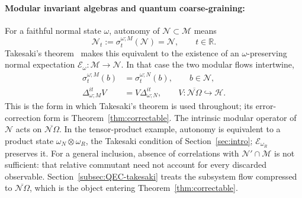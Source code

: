 \documentclass[a4paper,11pt]{article}
\theoremstyle{definition}
\newcommand{\nn}{\nonumber}
\newcommand{\mE}{\mathcal{E}}
\begin{document}
\paragraph{Modular invariant algebras and quantum coarse-graining:}
For a faithful normal state $\omega$, autonomy of $\mathcal N\subset\mathcal M$ means
\begin{equation}\label{eq:quantum-coarse-autonomy}
 \mathcal N_t:=\sigma^{\omega;M}_t(\mathcal N)=\mathcal N,\qquad t\in\mathbb R.
\end{equation}
Takesaki's theorem~\cite{Takesaki1972} makes this equivalent to the existence of
an $\omega$-preserving normal expectation $\mE_\omega:\mathcal M\to\mathcal N$. In that case the two modular flows intertwine,
\begin{align}
 \sigma^{\omega;M}_t(b)&=\sigma^{\omega;N}_t(b),\qquad b\in\mathcal N,\nn\\
 \Delta_{\omega;M}^{it}V&=V\Delta_{\omega;N}^{it},
 \qquad V:\overline{\mathcal N\Omega}\hookrightarrow\mathcal H.
 \label{eq:takesaki-intertwining}
\end{align}
This is the form in which Takesaki's theorem is used throughout; its error-correction form is Theorem~\ref{thm:correctable}.
The intrinsic modular operator of $\mathcal N$ acts on $\overline{\mathcal N\Omega}$.
In the tensor-product example, autonomy is equivalent to a product state
$\omega_N\otimes\omega_R$, the Takesaki condition of Section~\ref{sec:intro}; $\mE_{\omega_R}$ preserves it.
For a general inclusion, absence of correlations with $\mathcal N'\cap\mathcal M$ is not sufficient:
that relative commutant need not account for every discarded observable.
Section~\ref{subsec:QEC-takesaki} treats the subsystem flow compressed to
$\overline{\mathcal N\Omega}$, which is the object entering Theorem~\ref{thm:correctable}.

\end{document}
